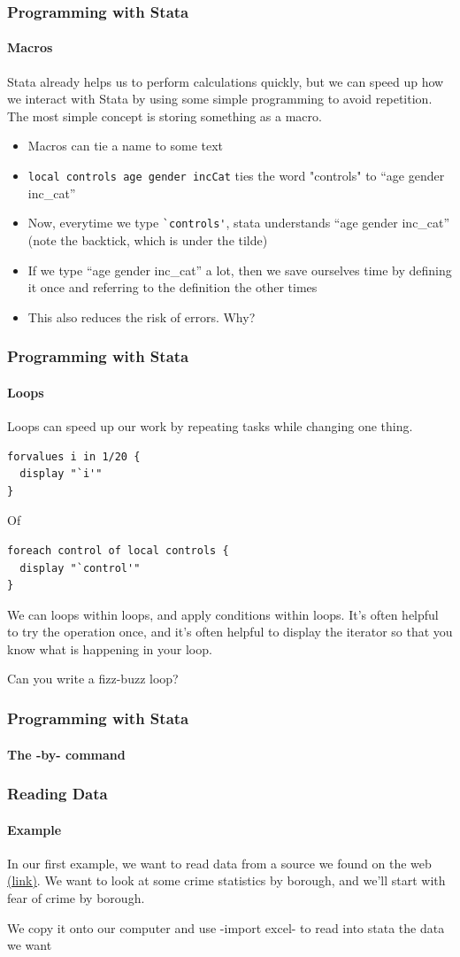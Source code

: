 \documentclass{beamer}
\begin{document}
\begin{frame}[fragile]
  \frametitle{Programming with Stata}
  \framesubtitle{Macros}
  Stata already helps us to perform calculations quickly, but we can speed up how we interact with Stata by using some simple programming to avoid repetition.  The most simple concept is storing something as a macro.
  \begin{itemize}
    \item Macros can tie a name to some text 
    \item \verb|local controls age gender incCat| ties the word "controls" to ``age gender inc\_cat''
    \item Now, everytime we type  \verb|`controls'|, stata understands ``age gender inc\_cat'' (note the backtick, which is under the tilde)
    \item If we type ``age gender inc\_cat'' a lot, then we save ourselves time by defining it once and referring to the definition the other times
    \item This also reduces the risk of errors. Why?
  \end{itemize}
\end{frame}

\begin{frame}[fragile]
  \frametitle{Programming with Stata}
  \framesubtitle{Loops}
  Loops can speed up our work by repeating tasks while changing one thing. 
  \begin{verbatim}
forvalues i in 1/20 {
  display "`i'"
}
  \end{verbatim}

Of

  \begin{verbatim}
foreach control of local controls {
  display "`control'"
}
  \end{verbatim}
  We can loops within loops, and apply conditions within loops. It's often helpful to try the operation once, and it's often helpful to display the iterator so that you know what is happening in your loop.
  
  Can you write a fizz-buzz loop?
\end{frame}

\begin{frame}[fragile]
  \frametitle{Programming with Stata}
  \framesubtitle{The -by- command}
\end{frame}

\begin{frame}
  \frametitle{Reading Data}
  \framesubtitle{Example}
In our first example, we want to read data from a source we found on the web \href{http://data.london.gov.uk/dataset/metropolitan-police-service-recorded-crime-figures-and-associated-data/resource/e831234d-2bde-4fff-8ab8-7e2e70f0677a}{(link)}. We want to look at some crime statistics by borough, and we'll start with fear of crime by borough.

We copy it onto our computer and use -import excel- to read into stata the data we want


\end{frame}
\end{document}
